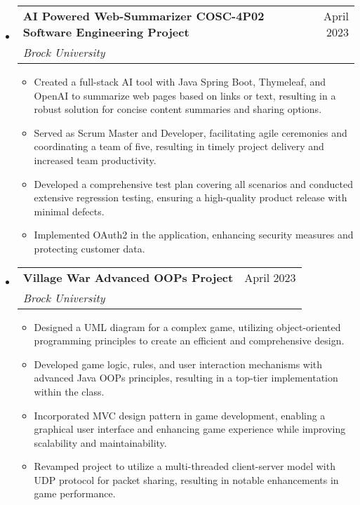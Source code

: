 \documentclass[letterpaper,11pt]{article}
\makeatletter
\newcommand{\resumeItem}[1]{
    \item\small{
            {#1 \vspace{-2pt}}
    }
}
\newcommand{\resumeSubheading}[4]{
    \vspace{-2pt}\item
    \begin{tabular*}{0.97\textwidth}[t]{l@{\extracolsep{\fill}}r}
    \textbf{#1} & #2 \\
    \textit{\small#3} & \textit{\small #4} \\
    \end{tabular*}\vspace{-7pt}
}
\newcommand{\resumeSubHeadingListStart}{\begin{itemize}[leftmargin=0.15in, label={}]}
\newcommand{\resumeSubHeadingListEnd}{\end{itemize}}
\newcommand{\resumeItemListStart}{\begin{itemize}}
\newcommand{\resumeItemListEnd}{\end{itemize}\vspace{-5pt}}
\makeatother
\begin{document}
\begin{center}
\resumeSubHeadingListStart
\resumeSubheading
{AI Powered Web-Summarizer COSC-4P02 Software Engineering Project}{April 2023}
{Brock University}{}
\resumeItemListStart
\resumeItem{Created a full-stack AI tool with Java Spring Boot, Thymeleaf, and OpenAI to summarize web pages based on links or text, resulting in a robust solution for concise content summaries and sharing options.}
\resumeItem{Served as Scrum Master and Developer, facilitating agile ceremonies and coordinating a team of five, resulting in timely project delivery and increased team productivity.}
\resumeItem{Developed a comprehensive test plan covering all scenarios and conducted extensive regression testing, ensuring a high-quality product release with minimal defects.}
\resumeItem{Implemented OAuth2 in the application, enhancing security measures and protecting customer data.}
\resumeItemListEnd
\resumeSubHeadingListEnd

\resumeSubHeadingListStart
\resumeSubheading
{Village War Advanced OOPs Project}{April 2023}
{Brock University}{}
\resumeItemListStart
\resumeItem{Designed a UML diagram for a complex game, utilizing object-oriented programming principles to create an efficient and comprehensive design.}
\resumeItem{Developed game logic, rules, and user interaction mechanisms with advanced Java OOPs principles, resulting in a top-tier implementation within the class.}
\resumeItem{Incorporated MVC design pattern in game development, enabling a graphical user interface and enhancing game experience while improving scalability and maintainability.}
\resumeItem{Revamped project to utilize a multi-threaded client-server model with UDP protocol for packet sharing, resulting in notable enhancements in game performance.}
\resumeItemListEnd
\resumeSubHeadingListEnd
\end{center}
\end{document}
